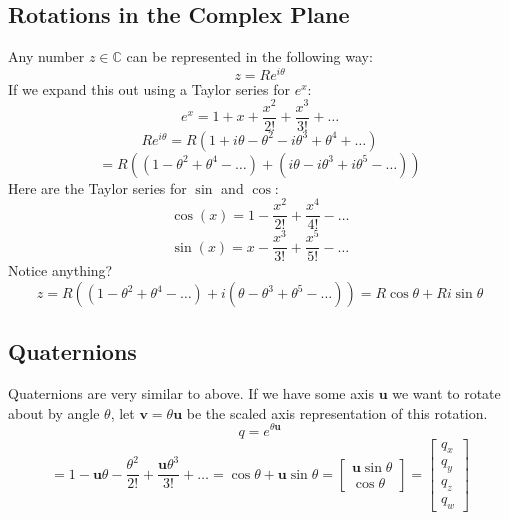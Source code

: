 \documentclass[11pt]{article}
\newcommand{\C}{\mathbb{C}}
\renewcommand{\vec}[1]{\mathbf{#1}}
\begin{document}
\subsection{Rotations in the Complex Plane}
Any number $z \in \C$ can be represented in the following way:
$$z = Re^{i\theta}$$
If we expand this out using a Taylor series for $e^x$:
$$e^x = 1 + x + \frac{x^2}{2!} + \frac{x^3}{3!} + \dots$$
$$Re^{i\theta} = R(1 + i\theta - \theta^2 -i\theta^3 + \theta^4 + \dots)$$
$$ = R((1 - \theta^2 + \theta^4 - \dots) + (i\theta - i\theta^3 + i\theta^5 - \dots))$$
Here are the Taylor series for $\sin$ and $\cos$:
$$\cos(x) = 1 - \frac{x^2}{2!} + \frac{x^4}{4!} - \dots$$
$$\sin(x) = x - \frac{x^3}{3!} + \frac{x^5}{5!} - \dots$$
Notice anything?
$$z = R((1 - \theta^2 + \theta^4 - \dots) + i(\theta - \theta^3 + \theta^5 - \dots)) = R\cos\theta + Ri\sin\theta$$
\begin{center}

\end{center}

\subsection{Quaternions}
Quaternions are very similar to above. If we have some axis $\vec{u}$ we want to rotate about by angle $\theta$, let $\vec{v} = \theta\vec{u}$ be the scaled axis representation of this rotation.
$$q = e^{\theta\vec{u}}$$
$$= 1 - \vec{u}\theta - \frac{\theta^2}{2!} + \frac{\vec{u}\theta^3}{3!} + \dots = \cos\theta + \vec{u}\sin\theta = \begin{bmatrix}
\vec{u}\sin\theta\\
\cos\theta
\end{bmatrix} = \begin{bmatrix}
q_x\\ q_y\\ q_z\\ q_w
\end{bmatrix}$$
\end{document}
